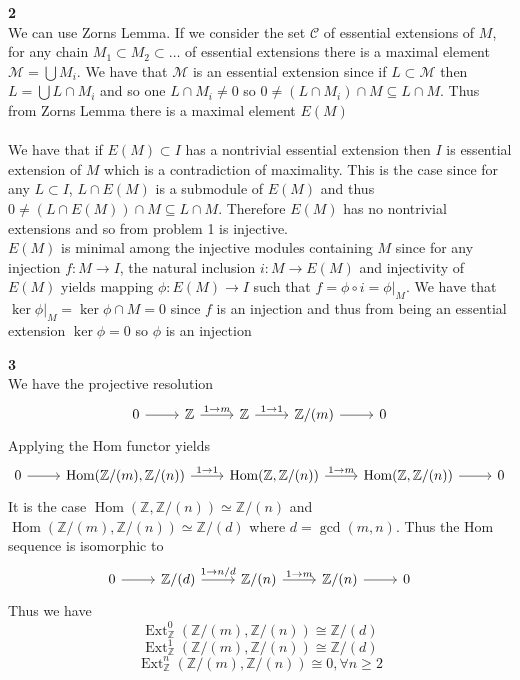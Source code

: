 \documentclass[12pt]{article}
\newenvironment{ques}[1]{\textbf{#1}\vspace{1 mm}\\ }{\bigskip}
\theoremstyle{definition}
\DeclareMathOperator\Ext{Ext}
\DeclareMathOperator\Hom{Hom}
\newcommand{\Z}{\mathbb Z}
\begin{document}
\begin{ques}{2}
	We can use Zorns Lemma. If we consider the set $\mathcal C$ of essential
	extensions of $M$, for any chain $M_1 \subset M_2 \subset \dots $ of
	essential extensions there is a maximal element $\mathcal M = \bigcup M_i$.
	We have that $\mathcal M$ is an essential extension since if $L \subset
	\mathcal M$ then $L = \bigcup L \cap M_i$ and so one $L \cap M_i \neq 0$ so
	$0 \neq (L \cap M_i) \cap M \subseteq L \cap M$. Thus from Zorns Lemma
	there is a maximal element $E(M)$\\
	\\
	We have that if $E(M) \subset I$ has a nontrivial essential extension then
	$I$ is essential extension of $M$ which is a contradiction of maximality.
	This is the case since for any $L \subset I$, $L \cap E(M)$ is a submodule of
	$E(M)$ and thus $0 \neq (L \cap E(M)) \cap M \subseteq L \cap M$. Therefore $E(M)$
	has no nontrivial extensions and so from problem 1 is injective. \\
	$E(M)$ is minimal among the injective modules containing $M$ since for any
	injection $f:M \to I$, the natural inclusion $i:M \to E(M)$ and injectivity
	of $E(M)$ yields mapping $\phi:E(M) \to I$ such that $f = \phi \circ i = \phi|_M$.
	We have that $\ker \phi|_M = \ker \phi \cap M = 0$ since $f$ is an
	injection and thus from being an essential extension $\ker \phi = 0$ so
	$\phi$ is an injection
\end{ques}

\begin{ques}{3}
	We have the projective resolution
	$$\begin{tikzcd}
	0 \arrow[r] & \Z \arrow[r, "1 \to m"] & \Z \arrow[r, "1 \to 1"] & \Z/(m)
	\arrow[r] & 0
	\end{tikzcd}$$
	Applying the Hom functor yields
	$$\begin{tikzcd}
	0 \arrow[r] & \Hom(\Z/(m),\Z/(n)) \arrow[r, "1 \to 1"] & \Hom(\Z, \Z/(n))
	\arrow[r, "1 \to m"] & \Hom(\Z, \Z/(n)) \arrow[r] & 0
	\end{tikzcd}$$
	It is the case $\Hom(\Z, \Z/(n)) \simeq \Z/(n)$ and
	$\Hom(\Z/(m),\Z/(n)) \simeq \Z/(d)$ where $d = \gcd(m,n)$. Thus the Hom
	sequence is isomorphic to
	$$\begin{tikzcd}
	0 \arrow[r] & \Z/(d) \arrow[r, "1 \to n/d"] & \Z/(n) \arrow[r, "1 \to m"] & \Z/(n)
	\arrow[r] & 0
	\end{tikzcd}$$
	Thus we have
	$$\Ext_{\Z}^0(\Z/(m), \Z/(n)) \cong \Z/(d)$$
	$$\Ext_{\Z}^1(\Z/(m), \Z/(n)) \cong \Z/(d)$$
	$$\Ext_{\Z}^n(\Z/(m), \Z/(n)) \cong 0, \forall n \geq 2$$
\end{ques}
\end{document}
